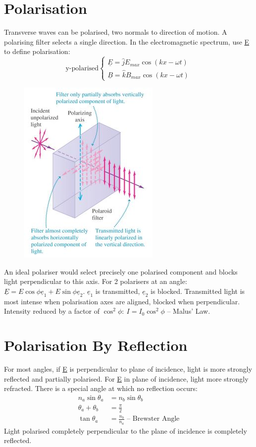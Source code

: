 \documentclass[a4paper, 11pt, normalem]{report}
\begin{document}
\section{Polarisation}
Transverse waves can be polarised, two normals to direction of motion.
A polarising filter selects a single direction.
In the electromagnetic spectrum, use \underline{E} to define polarisation:
\begin{equation}
    \text{y-polarised}
    \begin{cases}
        \underline{E} = \hat{j}E_{max}\cos{(kx - \omega t)} \\
        \underline{B} = \hat{k}B_{max}\cos{(kx - \omega t)}
    \end{cases}
\end{equation}
\begin{figure}[H]
    \centering
    \includegraphics[scale=0.8]{Polarisation.jpg} 
\end{figure}
An ideal polariser would select precisely one polarised component and blocks light perpendicular to this axis.
For 2 polarisers at an angle: $\underline{E} = E\cos{\phi}\underline{e}_{1} + E\sin{\phi}\underline{e}_{2}$.
$\underline{e}_{1}$ is transmitted, $\underline{e}_{2}$ is blocked.
Transmitted light is most intense when polarisation axes are aligned, blocked when perpendicular.
Intensity reduced by a factor of $\cos^{2}{\phi}:~I = I_{0}\cos^{2}{\phi}$ -- Malus' Law.

\section{Polarisation By Reflection}
For most angles, if \underline{E} is perpendicular to plane of incidence, light is more strongly reflected and partially polarised.
For \underline{E} in plane of incidence, light more strongly refracted.
There is a special angle at which no reflection occurs:
\begin{align}
    n_{a}\sin{\theta_{a}} &= n_{b}\sin{\theta_{b}} \\
    \theta_{a} + \theta_{b} &= \frac{\pi}{2} \\
    \tan{\theta_{a}} &= \frac{n_{b}}{n_{a}}\text{ -- Brewster Angle}
\end{align}
Light polarised completely perpendicular to the plane of incidence is completely reflected.
\end{document}
